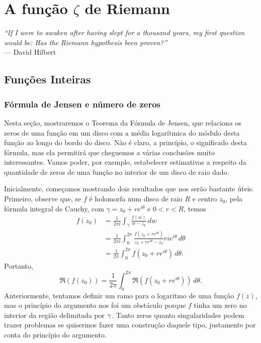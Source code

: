 \chapter{A função \texorpdfstring{$\zeta$}{zeta} de Riemann}
\chaptermark{}

\hfill%
\begin{minipage}{10cm}
    \begin{flushright}
    \rightskip=0.5cm
        \textit{%
            ``If I were to awaken after having slept for a thousand years, my first question would be: Has the Riemann hypothesis been proven?''
        }
        \\[0.1cm]
    \rightskip=0.5cm
    --- David Hilbert
    \end{flushright}
\end{minipage}

\section{Funções Inteiras}
    \subsection{Fórmula de Jensen e número de zeros}
    
    Nesta seção, mostraremos o Teorema da Fórmula de Jensen, que relaciona os zeros 
    de uma função em um disco com a média logarítmica do módulo desta função ao 
    longo do bordo do disco. Não é claro, a princípio, o significado desta fórmula,
    mas ela permitirá que cheguemos a várias conclusões muito interessantes. 
    Vamos poder, por exemplo, estabelecer estimativas a respeito da quantidade 
    de zeros de uma função no interior de um disco de raio dado.
    
    Inicialmente, começamos mostrando dois resultados que nos serão bastante úteis.
    Primeiro, observe que, se $f$ é holomorfa num disco de raio $R$ e centro $z_0$,
    pela fórmula integral de Cauchy, com $\gamma = z_0 + re^{i\theta}$ e $0 < r < R$,
    temos
    \begin{align*}
        f(z_0) &= \frac{1}{2\pi i}\int_\gamma \frac{f(w)}{w - z_0} \, dw \\
        &= \frac{1}{2\pi i} \int_{0}^{2\pi} \frac{f(z_0 + re^{i\theta})}{z_0 + re^{i\theta} - z_0} rie^{i\theta} \, d\theta \\
        &= \frac{1}{2\pi}\int_{0}^{2\pi}f(z_0 + re^{i\theta}) \, d\theta.
    \end{align*}
    Portanto,
    \begin{equation*}
        \Re(f(z_0)) 
        = \frac{1}{2\pi}\int_{0}^{2\pi}\Re(f(z_0 + re^{i\theta})) \, d\theta.
    \end{equation*}
    Anteriormente, tentamos definir um ramo para o logaritmo de uma função $f(z)$, 
    mas o princípio do argumento nos foi um obstáculo porque $f$ tinha um zero 
    no interior da região delimitada por $\gamma$. Tanto zeros quanto singularidades 
    podem trazer problemas  se quisermos fazer uma construção daquele tipo, justamente
    por conta do princípio do argumento. 
    
